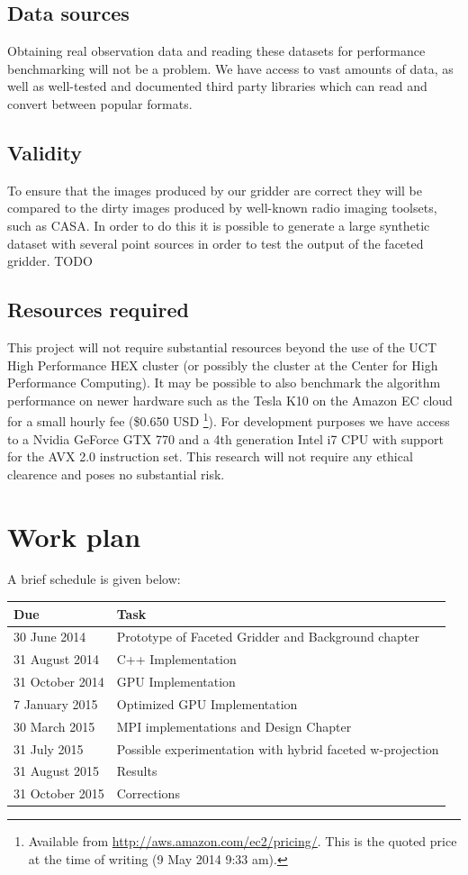 \documentclass[a4paper, two column]{article}
\begin{document}
\subsection{Data sources}
Obtaining real observation data and reading these datasets for performance benchmarking will not be a problem. We have access to vast amounts of data, as well as well-tested and documented third party libraries which can read and convert between
popular formats.
\subsection{Validity}
 To ensure that the images produced by our gridder are correct they will be compared to the dirty images produced by well-known radio imaging toolsets, such as CASA. In order to do this it is possible to generate a large synthetic dataset with several point sources
 in order to test the output of the faceted gridder.
 {\color{red}TODO}
\subsection{Resources required} 
 This project will not require substantial resources beyond the use of the UCT High Performance HEX cluster (or possibly the cluster at the Center for High Performance Computing). It may be possible to also benchmark the algorithm performance
 on newer hardware such as the Tesla K10 on the Amazon EC cloud for a small hourly fee (\$0.650 USD \footnote{Available from \url{http://aws.amazon.com/ec2/pricing/}. This is the quoted price at the time of writing (9 May 2014 9:33 am).}). For development purposes we have access to a Nvidia GeForce 
 GTX 770 and a 4th generation Intel i7 CPU with support for the AVX 2.0 instruction set. This research will not require any ethical clearence and poses no substantial risk.
\section{Work plan}
A brief schedule is given below:\\
\begin{tabular}{|p{2.5cm}|p{5cm}|}
 \hline
 \textbf{Due} & \textbf{Task} \\
 \hline
 30 June 2014 & Prototype of Faceted Gridder and Background chapter\\
 \hline
 31 August 2014 & C++ Implementation\\
 \hline
 31 October 2014 & GPU Implementation\\
 \hline
 7 January 2015 & Optimized GPU Implementation\\
 \hline
 30 March 2015 & MPI implementations and Design Chapter\\
 \hline
 31 July 2015 & Possible experimentation with hybrid faceted w-projection\\
 \hline
 31 August 2015 & Results \\
 \hline
 31 October 2015 & Corrections \\
 \hline
\end{tabular}
{


}
\end{document}
